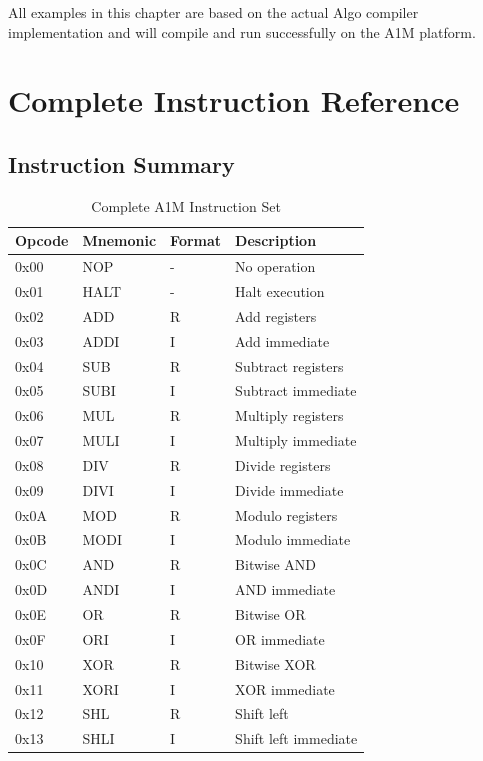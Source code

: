 \documentclass[12pt,a4paper,oneside]{book}
\begin{document}
All examples in this chapter are based on the actual Algo compiler implementation and will compile and run successfully on the A1M platform.

\chapter{Complete Instruction Reference}

\section{Instruction Summary}

\begin{table}[H]
\centering
\caption{Complete A1M Instruction Set}
\small
\begin{tabularx}{\textwidth}{|l|l|l|X|}
\hline
\textbf{Opcode} & \textbf{Mnemonic} & \textbf{Format} & \textbf{Description} \\
\hline
0x00 & NOP & - & No operation \\
0x01 & HALT & - & Halt execution \\
0x02 & ADD & R & Add registers \\
0x03 & ADDI & I & Add immediate \\
0x04 & SUB & R & Subtract registers \\
0x05 & SUBI & I & Subtract immediate \\
0x06 & MUL & R & Multiply registers \\
0x07 & MULI & I & Multiply immediate \\
0x08 & DIV & R & Divide registers \\
0x09 & DIVI & I & Divide immediate \\
0x0A & MOD & R & Modulo registers \\
0x0B & MODI & I & Modulo immediate \\
0x0C & AND & R & Bitwise AND \\
0x0D & ANDI & I & AND immediate \\
0x0E & OR & R & Bitwise OR \\
0x0F & ORI & I & OR immediate \\
0x10 & XOR & R & Bitwise XOR \\
0x11 & XORI & I & XOR immediate \\
0x12 & SHL & R & Shift left \\
0x13 & SHLI & I & Shift left immediate \\

\end{tabularx}
\end{table}
\end{document}
